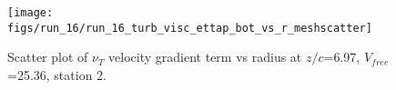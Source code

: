 \begin{figure}[H]
\centering
\texttt{[image: figs/run\_16/run\_16\_turb\_visc\_ettap\_bot\_vs\_r\_meshscatter]}
\caption{Scatter plot of $\nu_T$ velocity gradient term vs radius at $z/c$=6.97, $V_{free}$=25.36, station 2.}
\label{fig:run_16_turb_visc_ettap_bot_vs_r_meshscatter}
\end{figure}


